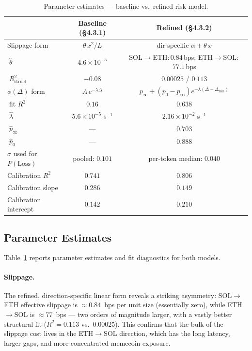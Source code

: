 \documentclass[11pt,a4paper]{article}
\newcommand{\SolEth}{SOL$\to$ETH}
\newcommand{\EthSol}{ETH$\to$SOL}
\begin{document}
\begin{table}[t]
    \centering
    \small
    \caption{Parameter estimates --- baseline vs.\ refined risk model.}
    \label{tab:ch4-validation}
    \begin{tabular}{lcc}
        \toprule
        & Baseline (§4.3.1) & Refined (§4.3.2) \\
        \midrule
        Slippage form & $\theta\,x^{2}/L$ & dir-specific $\alpha + \theta\,x$ \\
        $\;\hat\theta$ & $4.6\!\times\!10^{-5}$ & \SolEth:\,$0.84$\,bps; \EthSol:\,$77.1$\,bps \\
        $\;R^{2}_{\text{struct}}$ & $-0.08$ & $0.00025$ / $0.113$ \\
        \addlinespace
        $\phi(\Delta)$ form & $A\,e^{-\lambda\Delta}$ & $p_{\infty}+(p_{0}-p_{\infty})e^{-\lambda(\Delta-\Delta_{\min})}$ \\
        $\;$fit $R^{2}$ & $0.16$ & $\mathbf{0.638}$ \\
        $\;\hat\lambda$ & $5.6\!\times\!10^{-5}$ s$^{-1}$ & $2.16\!\times\!10^{-2}$ s$^{-1}$ \\
        $\;\hat p_{\infty}$ & --- & $0.703$ \\
        $\;\hat p_{0}$ & --- & $0.888$ \\
        \addlinespace
        $\sigma$ used for $P(\text{Loss})$ & pooled: $0.101$ & per-token median: $0.040$ \\
        Calibration $R^{2}$ & $0.741$ & $\mathbf{0.806}$ \\
        Calibration slope & $0.286$ & $0.149$ \\
        Calibration intercept & $0.142$ & $0.210$ \\
        \bottomrule
    \end{tabular}
\end{table}

\subsection{Parameter Estimates}

Table~\ref{tab:ch4-validation} reports parameter estimates and fit
diagnostics for both models.

\paragraph{Slippage.} The refined, direction-specific linear form reveals
a striking asymmetry: \SolEth{} effective slippage is $\approx\!0.84$~bps
per unit size (essentially zero), while \EthSol{} is $\approx\!77$~bps ---
two orders of magnitude larger, with a vastly better structural fit
($R^{2}\!=\!0.113$ vs.\ $0.00025$). This confirms that the bulk of the
slippage cost lives in the \EthSol{} direction, which has the long
latency, larger gaps, and more concentrated memecoin exposure.
\end{document}

